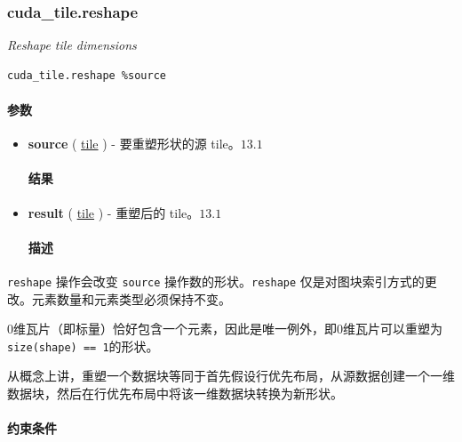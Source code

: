 \documentclass{article}
\begin{document}
\subsubsection{cuda\_tile.reshape}

\textit{Reshape tile dimensions}


\begin{lstlisting}
cuda_tile.reshape %source
\end{lstlisting}

\paragraph{参数}

\begin{itemize}
\item \textbf{source} ( \href{https://docs.nvidia.com/cuda/tile-ir/latest/sections/types.html#type-tile}{tile} ) - 要重塑形状的源 tile。$\boxed{13.1}$


\paragraph{结果}

\item \textbf{result} ( \href{https://docs.nvidia.com/cuda/tile-ir/latest/sections/types.html#type-tile}{tile} ) - 重塑后的 tile。$\boxed{13.1}$


\paragraph{描述}

\end{itemize}
\texttt{reshape} 操作会改变 \texttt{source} 操作数的形状。\texttt{reshape} 仅是对图块索引方式的更改。元素数量和元素类型必须保持不变。


0维瓦片（即标量）恰好包含一个元素，因此是唯一例外，即0维瓦片可以重塑为\texttt{size(shape) == 1}的形状。


从概念上讲，重塑一个数据块等同于首先假设行优先布局，从源数据创建一个一维数据块，然后在行优先布局中将该一维数据块转换为新形状。



\paragraph{约束条件}
\end{document}

